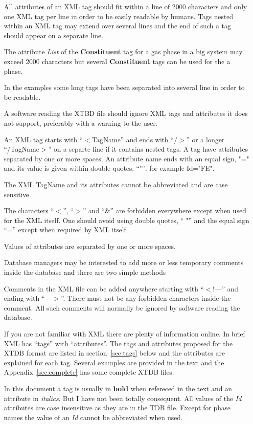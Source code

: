 \documentclass{article}
\begin{document}
All attributes of an XML tag should fit within a line of 2000
characters and only one XML tag per line in order to be easily
readable by humans.  Tags nested within an XML tag may extend over
several lines and the end of such a tag should appear on a separate line.

The attribute {\em List} of the {\bf Constituent} tag for a gas phase
in a big system may exceed 2000 characters but several {\bf
  Constituent} tags can be used for the a phase.

In the examples some long tags have been separated into several line
in order to be readable.

A software reading the XTBD file should ignore XML tags and attributes
it does not support, preferably with a warning to the user.

An XML tag starts with ``$<$TagName'' and ends with ``/$>$'' or a
longer ``/TagName$>$'' on a separte line if it contains nested tags.
A tag have attributes separated by one or more spaces.  An attribute
name ends with an equal sign, "=" and its value is given within double
quotes, ``"'', for example Id="FE".

The XML TagName and its attributes cannot be abbreviated and are case
sensitive.

The characters ``$<$'', ``$>$''  and ``\&'' are forbidden everywhere
except when used for the XML itself.  One should avoid using double
quotes, `` "'' and the equal sign ``='' except when required by XML
itself.

Values of attributes are separated by one or more spaces.

Database managers may be interested to add more or less temporary
comments inside the database and there are two simple methods

Comments in the XML file can be added anywhere starting with
``$<$!---'' and ending with ``---$>$''.  There must not be any
forbidden characters inside the comment.  All such comments will
normally be ignored by software reading the database.

If you are not familiar with XML there are plenty of information
online.  In brief XML has ``tags'' with ``attributes''.  The tags and
attributes proposed for the XTDB format are listed in
section~\ref{sec:tags} below and the attributes are explained for each
tag.  Several examples are provided in the text and the
Appendix~\ref{sec:complete} has some complete XTDB files.

In this document a tag is usually in {\bf bold} when refereced in the
text and an attribute in {\em italics}.  But I have not been totally
consequent.  All values of the {\em Id} attributes are case
insensitive as they are in the TDB file.  Except for phase names the
value of an {\em Id} cannot be abbreviated when used.
\end{document}
